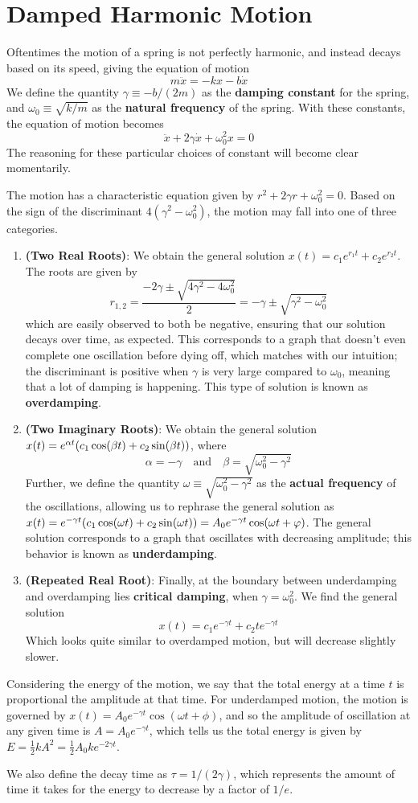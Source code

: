 \section{Damped Harmonic Motion}
Oftentimes the motion of a spring is not perfectly harmonic, and instead decays based on its speed, giving the equation of motion
\[ m\ddot x= -kx - b\dot x\]
We define the quantity $\gamma \equiv -b/(2m)$ as the \textbf{damping constant} for the spring, and $\omega_0 \equiv \sqrt{k/m}$ as the \textbf{natural frequency} of the spring. With these constants, the equation of motion becomes  
\[ \ddot x + 2\gamma \dot x + \omega_0^2 x = 0\]
The reasoning for these particular choices of constant will become clear momentarily. 

The motion has a characteristic equation given by $r^2 + 2\gamma r + \omega_0^2 = 0$. Based on the sign of the discriminant $4(\gamma^2 - \omega_0^2)$, the motion may fall into one of three categories.


\begin{enumerate}
    \item \textbf{(Two Real Roots)}: We obtain the general solution $x(t) = c_1e^{r_1t} + c_2e^{r_2t}$. The roots are given by 
    \[ r_{1,2} = \frac{-2\gamma \pm \sqrt{4\gamma ^2-4\omega_0^2}}{2} = -\gamma \pm \sqrt{\gamma^2-\omega_0^2} \]
    which are easily observed to both be negative, ensuring that our solution decays over time, as expected. This corresponds to a graph that doesn't even complete one oscillation before dying off, which matches with our intuition; the discriminant is positive when $\gamma$ is very large compared to $\omega_0$, meaning that a lot of damping is happening. This type of solution is known as \textbf{overdamping}.

    \item \textbf{(Two Imaginary Roots)}: We obtain the general solution $x(t) = e^{\alpha t}\pqty{c_1 \cos (\beta t) + c_2\sin(\beta t)}$, where 
    \[ \alpha = -\gamma  \quad\text{and}\quad \beta = \sqrt{\omega_0^2 - \gamma^2}\]
    Further, we define the quantity $\omega \equiv \sqrt{\omega_0^2 - \gamma^2}$ as the \textbf{actual frequency} of the oscillations, allowing us to rephrase the general solution as $x(t) = e^{-\gamma t}\pqty{c_1\cos(\omega t) + c_2\sin(\omega t)} = A_0e^{-\gamma t}\cos(\omega t + \phi)$. The general solution corresponds to a graph that oscillates with decreasing amplitude; this behavior is known as \textbf{underdamping}.
    \item \textbf{(Repeated Real Root)}: Finally, at the boundary between underdamping and overdamping lies \textbf{critical damping}, when $\gamma = \omega^2_0$. We find the general solution
    \[ x(t) = c_1 e^{-\gamma t} + c_2te^{-\gamma t} \]
    Which looks quite similar to overdamped motion, but will decrease slightly slower.
\end{enumerate}
Considering the energy of the motion, we say that the total energy at a time $t$ is proportional the amplitude at that time. For underdamped motion, the motion is governed by $x(t) = A_0e^{-\gamma t}\cos(\omega t + \phi)$, and so the amplitude of oscillation at any given time is $A = A_0e^{-\gamma t}$,  which tells us the total energy is given by $E = \frac{1}{2}kA^2 = \frac{1}{2}A_0ke^{-2\gamma t}$. 

We also define the decay time as $\tau = 1/(2\gamma)$, which represents the amount of time it takes for the energy to decrease by a factor of $1/e$. 